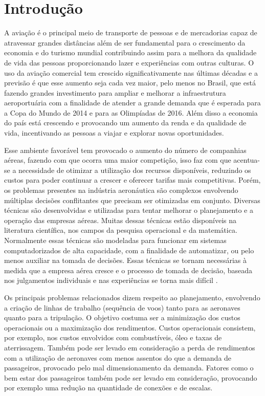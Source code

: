 \chapter{Introdução}
  
 A aviação é o principal meio de transporte de pessoas e de mercadorias capaz
 de atravessar grandes distâncias além de ser fundamental para o crescimento
 da economia e do turismo mundial contribuindo assim para a melhora da
 qualidade de vida das pessoas proporcionando lazer e experiências com outras
 culturas. O uso da aviação comercial tem crescido significativamente nas
 últimas décadas e a previsão é que esse aumento seja cada vez maior, pelo
 menos no Brasil, que está fazendo grandes investimento para ampliar e
 melhorar a infraestrutura aeroportuária com a finalidade de atender a grande
 demanda que é esperada para a Copa do Mundo de 2014 e para as Olimpíadas de
 2016. Além disso a economia do país está crescendo e provocando um aumento da
 renda e da qualidade de vida, incentivando as pessoas a viajar e explorar novas
 oportunidades.

  	
Esse ambiente favorável tem provocado o aumento do número de companhias
aéreas, fazendo com que ocorra uma maior competição, isso faz com que acentua-se
a necessidade de otimizar a utilização dos recursos disponíveis, reduzindo os
custos para poder continuar a crescer e oferecer tarifas mais competitivas.
Porém, os problemas presentes na indústria aeronáutica são complexos envolvendo
múltiplas decisões conflitantes que precisam ser otimizadas em conjunto.
Diversas técnicas são desenvolvidas e utilizadas para tentar melhorar o
planejamento e a operação das empresas aéreas. Muitas dessas técnicas estão
disponíveis na literatura científica, nos campos da pesquisa operacional e da
matemática. Normalmente essas técnicas são modeladas para funcionar em sistemas
computadorizados de alta capacidade, com a finalidade de automatizar, ou pelo
menos auxiliar na tomada de decisões. Essas técnicas se tornam
necessárias à medida que a empresa aérea cresce e o processo de tomada de
decisão, baseada nos julgamentos individuais e nas experiências se torna mais
difícil \cite{ahmed2009}.
  	
  	
Os principais problemas relacionados dizem respeito ao planejamento, envolvendo
a criação de linhas de trabalho (sequência de voos) tanto para as aeronaves
quanto para a tripulação. O objetivo costuma ser a minimização dos custos operacionais ou a
maximização dos rendimentos. Custos operacionais consistem, por exemplo, nos
custos envolvidos com combustíveis, óleo e taxas de aterrissagem. Também pode
ser levado em consideração a perda de rendimentos com a utilização de aeronaves
com menos assentos do que a demanda de passageiros, provocado pelo mal
dimensionamento da demanda. Fatores como o bem estar dos passageiros também pode
ser levado em consideração, provocando por exemplo uma redução na quantidade de
conexões e de escalas.
	
